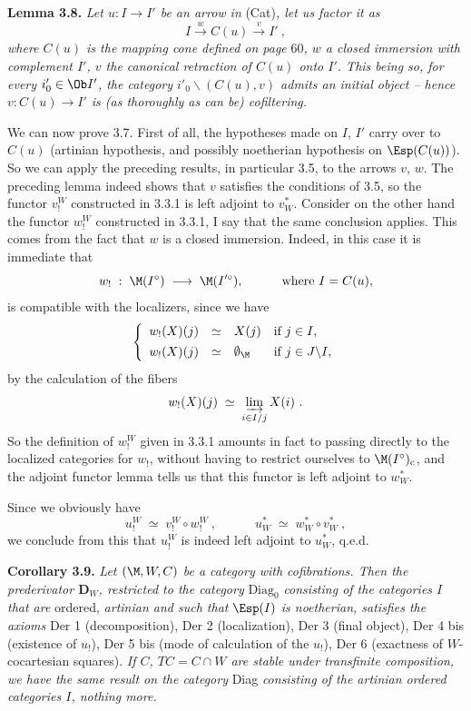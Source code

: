 \textbf{Lemma 3.8.} \textit{Let $u : I\longrightarrow I'$ be an arrow in} (Cat)\textit{, let us factor it as}
\[
I \xrightarrow{\;w\;} C(u) \xrightarrow{\;v\;} I'\ ,
\]
\textit{where $C(u)$ is the mapping cone defined on page} 60\textit{, $w$ a closed immersion with complement $I'$, $v$ the canonical retraction of $C(u)$ onto $I'$. This being so, for every $i'_0\in\Ob I'$, the category $i'_0\backslash(C(u),v)$ admits an initial object – hence $v : C(u)\longrightarrow I'$ is (as thoroughly as can be) cofiltering.}

We can now prove 3.7. First of all, the hypotheses made on $I$, $I'$ carry over to $C(u)$ (artinian hypothesis, and possibly noetherian hypothesis on $\Esp(C(u))$). So
we can apply the preceding results, in particular 3.5, to the arrows $v$, $w$. The preceding lemma indeed shows that $v$ satisfies the conditions of 3.5, so the functor $v_!^W$ constructed in 3.3.1 is left adjoint to $v_W^*$. Consider on the other hand the functor $w_!^W$ constructed in 3.3.1, I say that the same conclusion applies. This comes from the fact that $w$ is a closed immersion. Indeed, in this case it is immediate that
\[
w_! \;:\; \M(I^\circ) \;\longrightarrow\; \M(I'^\circ), \qquad\quad \text{where } I = C(u), %
\]
is compatible with the localizers, since we have
\[
\left\{
\begin{array}{lcll}
w_!(X)(j) & \simeq & X(j) & \text{if } j\in I,\\[1ex]
w_!(X)(j) & \simeq & \emptyset_{\M} & \text{if } j\in J\backslash I,
\end{array}
\right.
\]
by the calculation of the fibers
\[
w_!(X)(j) \;\simeq\; \varinjlim_{i\in I/j} X(i)\ .
\]
So the definition of $w_!^W$ given in 3.3.1 amounts in fact to passing directly to the localized categories for $w_!$, without having to restrict ourselves to $\M(I^\circ)_{\mathrm{c}}$, and the adjoint functor lemma tells us that
this functor is left adjoint to $w_W^*$.

Since we obviously have
\[
u_!^W \;\simeq\; v_!^W\circ w_!^W\ , \qquad\quad u_W^* \;\simeq\; w_W^*\circ v_W^*\ ,
\]
we conclude from this that $u_!^W$ is indeed left adjoint to $u_W^*$, q.e.d.

\textbf{Corollary 3.9.} \textit{Let $(\M,W,C)$ be a category with cofibrations. Then the prederivator $\mathbf{D}_W$, restricted to the category} $\mathrm{Diag}_0$ \textit{consisting of the categories $I$ that are} ordered, \textit{artinian and such that} $\Esp(I)$ \textit{is noetherian, satisfies the axioms} Der 1 (decomposition), Der 2 (localization), Der 3 (final object), Der 4 bis (existence of $u_!$), Der 5 bis (mode of calculation of the $u_!$), Der 6 (exactness of $W$-cocartesian squares). \textit{If $C$, $TC = C\cap W$ are stable under transfinite composition, we have the same result on the category} Diag \textit{consisting of the artinian ordered categories $I$, nothing more.}

